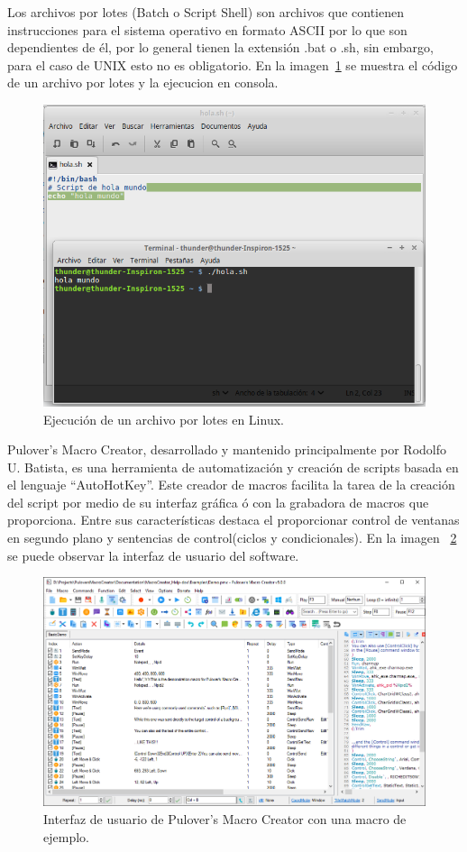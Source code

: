 Los archivos por lotes (Batch o Script Shell) \cite{Silberschatz1999} son
 archivos que contienen instrucciones para el sistema operativo en formato
 ASCII por lo que son dependientes de él, por lo general tienen la extensión
 .bat o .sh, sin embargo, para el caso de UNIX esto no es obligatorio. En la
 imagen~\ref{fig:script} se muestra el código de un archivo por lotes y la 
 ejecucion en consola.


\begin{figure}[H]
\centering
\includegraphics[width=0.7\columnwidth]{CapituloI/Imagenes/Script.png}
\caption{Ejecución de un archivo por lotes en Linux.}
\label{fig:script}
\end{figure}


Pulover's Macro Creator\cite{Batista}, desarrollado y mantenido
 principalmente por Rodolfo U. Batista, es una herramienta de automatización
 y creación de scripts basada en el lenguaje ``AutoHotKey''. Este creador de
 macros facilita la tarea de la creación del script por medio de su interfaz
 gráfica ó con la grabadora de macros que proporciona. Entre sus
 características destaca el proporcionar control de ventanas en segundo plano
 y sentencias de control(ciclos y condicionales). En la imagen
 ~\ref{fig:macros} se puede observar la interfaz de usuario del software.


\begin{figure}[H]
\centering
\includegraphics[width=0.7\columnwidth]{CapituloI/Imagenes/Macros.png}
\caption{Interfaz de usuario de Pulover's Macro Creator con una macro de
 ejemplo.}
\label{fig:macros}
\end{figure}



